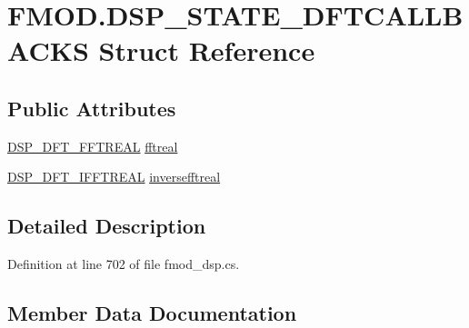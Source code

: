 \hypertarget{struct_f_m_o_d_1_1_d_s_p___s_t_a_t_e___d_f_t_c_a_l_l_b_a_c_k_s}{}\section{F\+M\+O\+D.\+D\+S\+P\+\_\+\+S\+T\+A\+T\+E\+\_\+\+D\+F\+T\+C\+A\+L\+L\+B\+A\+C\+KS Struct Reference}
\label{struct_f_m_o_d_1_1_d_s_p___s_t_a_t_e___d_f_t_c_a_l_l_b_a_c_k_s}
\subsection*{Public Attributes}
\begin{DoxyCompactItemize}
\item 
\hyperlink{namespace_f_m_o_d_aa012e977ef18d324c0c35f6b708c131d}{D\+S\+P\+\_\+\+D\+F\+T\+\_\+\+F\+F\+T\+R\+E\+AL} \hyperlink{struct_f_m_o_d_1_1_d_s_p___s_t_a_t_e___d_f_t_c_a_l_l_b_a_c_k_s_a600f8f41560b037f596c71cb90e7d6b5}{fftreal}
\item 
\hyperlink{namespace_f_m_o_d_acff7f43ee3fdbeba059b99619bb9f8f5}{D\+S\+P\+\_\+\+D\+F\+T\+\_\+\+I\+F\+F\+T\+R\+E\+AL} \hyperlink{struct_f_m_o_d_1_1_d_s_p___s_t_a_t_e___d_f_t_c_a_l_l_b_a_c_k_s_a314e0dc37bc287ee40c68747003d305f}{inversefftreal}
\end{DoxyCompactItemize}


\subsection{Detailed Description}


Definition at line 702 of file fmod\+\_\+dsp.\+cs.



\subsection{Member Data Documentation}
\mbox{\label{struct_f_m_o_d_1_1_d_s_p___s_t_a_t_e___d_f_t_c_a_l_l_b_a_c_k_s_a600f8f41560b037f596c71cb90e7d6b5}} 

